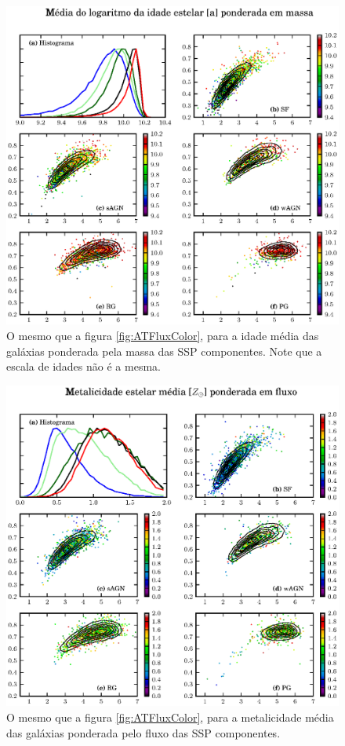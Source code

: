\begin{figure}
	\includegraphics{figuras/uvcolor-color-at_mass-byclass.eps}
	\caption[Idade média das galáxias ponderada em massa no diagrama cor--cor UV.]
	{O mesmo que a figura \ref{fig:ATFluxColor}, para a idade média das galáxias
	ponderada pela massa das SSP componentes. Note que a escala de idades não é a
	mesma.}
	\label{fig:ATMassColor}
\end{figure}

\begin{figure}
	\includegraphics{figuras/uvcolor-color-am_flux-byclass.eps}
	\caption[Metalicidade das galáxias ponderada em fluxo no diagrama cor--cor UV.]
	{O mesmo que a figura \ref{fig:ATFluxColor}, para a metalicidade média das
	galáxias ponderada pelo fluxo das SSP componentes.}
	\label{fig:AMFluxColor}
\end{figure}

